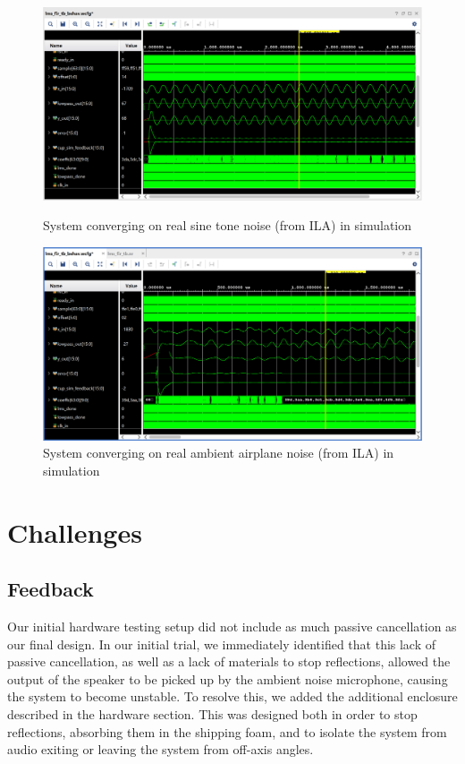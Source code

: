 \documentclass{fpgairpods}
\begin{document}
\begin{figure}
\centering
\includegraphics[width=450pt]{./figs/nlms_test_bench_sine_ila.png}
\caption{System converging on real sine tone noise (from ILA) in simulation}
\label{fig:sinenoisesimulation}

\bigskip
\includegraphics[width=450pt]{./figs/nlms_test_bench_plane_ila.png}
\caption{System converging on real ambient airplane noise (from ILA) in simulation}
\label{fig:ambientnoisesimulation}
\end{figure}

\section{Challenges}
\subsection{Feedback}
Our initial hardware testing setup did not include as much passive cancellation as our final design. In our initial trial, we immediately identified that this lack of passive cancellation, as well as a lack of materials to stop reflections, allowed the output of the speaker to be picked up by the ambient noise microphone, causing the system to become unstable. To resolve this, we added the additional enclosure described in the hardware section. This was designed both in order to stop reflections, absorbing them in the shipping foam, and to isolate the system from audio exiting or leaving the system from off-axis angles.
\end{document}
